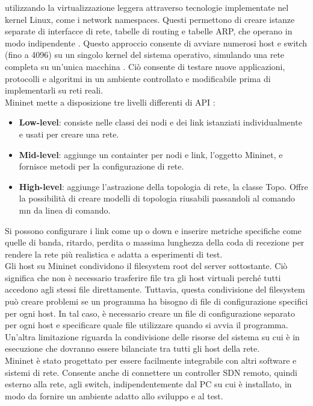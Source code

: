 utilizzando la virtualizzazione leggera attraverso tecnologie implementate nel kernel Linux, come i network namespaces.
Questi permettono di creare istanze separate di interfacce di rete, tabelle di routing e tabelle ARP, che operano in modo indipendente \cite{tesiMininet}. 
Questo approccio consente di avviare numerosi host e switch (fino a 4096) su un singolo kernel del sistema operativo, simulando una rete completa su un'unica macchina \cite{MininetOv}.
Ciò consente di testare nuove applicazioni, protocolli e algoritmi in un ambiente controllato e modificabile prima di implementarli su reti reali.
\\Mininet mette a disposizione tre livelli differenti di API \cite{introMin}:
\begin{itemize}
\item \textbf{Low-level}: consiste nelle classi dei nodi e dei link istanziati individualmente e usati per creare una rete.
\item \textbf{Mid-level}: aggiunge un containter per nodi e link, l'oggetto Mininet, e fornisce metodi per la configurazione di rete.
\item \textbf{High-level}: aggiunge l'astrazione della topologia di rete, la classe Topo. Offre la possibilità di creare modelli di topologia riusabili passandoli al comando mn da linea di comando.
\end{itemize}
Si possono configurare i link come up o down e inserire metriche specifiche 
come quelle di banda, ritardo, perdita o massima lunghezza della coda di recezione per rendere la rete più realistica e adatta a esperimenti di test.
\\Gli host su Mininet condividono il filesystem root del server sottostante. 
Ciò significa che non è necessario trasferire file tra gli host virtuali perché tutti accedono agli stessi file direttamente.
Tuttavia, questa condivisione del filesystem può creare problemi se un programma ha bisogno di file di configurazione specifici per ogni host. 
In tal caso, è necessario creare un file di configurazione separato per ogni host e specificare quale file utilizzare quando si avvia il programma.
Un'altra limitazione riguarda la condivisione delle risorse del sistema su cui è in esecuzione che dovranno essere bilanciate tra tutti gli host della rete.
\\Mininet è stato progettato per essere facilmente integrabile con altri software e sistemi di rete.
Consente anche di connettere un controller SDN remoto, quindi esterno alla rete, agli switch, indipendentemente dal PC su cui è installato, in modo da fornire un ambiente adatto allo sviluppo e al test.


